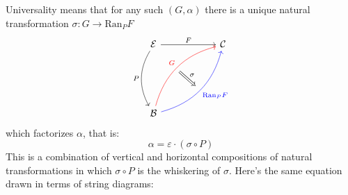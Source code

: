 \documentclass[DaoFP]{subfiles}
\begin{document}
Universality means that for any such $(G, \alpha)$ there is a unique natural transformation $\sigma \colon G \to \text{Ran}_P F$
\[
\begin{tikzcd}[row sep=2cm, column sep=2cm]
\cat E  \ar[d, bend right, "P"', "" {name=P}]
            \ar[r, "F", ""  {name=F, below, near start, bend right}]
&
\cat C
\\
\cat B
    \ar[ur, red, bend left, "G", "" {name=G, below}]
    \ar[ur, blue, bend right, "\text{Ran}_P F"', "" {name=Ran}]
\arrow[Rightarrow, "\sigma", from=G, to=Ran]
\end{tikzcd}
\]
 which factorizes $\alpha$, that is:
\[ \alpha = \varepsilon \cdot (\sigma \circ P) \]
This is a combination of vertical and horizontal compositions of natural transformations in which $\sigma \circ P$ is the whiskering of $\sigma$. Here's the same equation drawn in terms of string diagrams:
\end{document}
